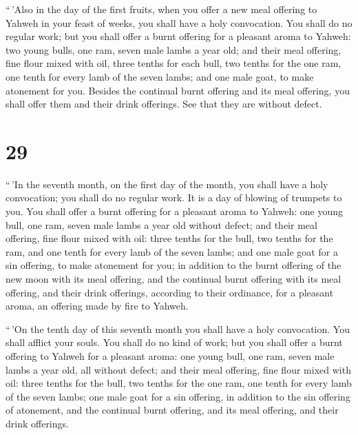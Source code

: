  ``\,'Also in the day of the first fruits, when you offer
a new meal offering to Yahweh in your feast of weeks, you shall have a
holy convocation. You shall do no regular work;  but you
shall offer a burnt offering for a pleasant aroma to Yahweh: two young
bulls, one ram, seven male lambs a year old;  and their
meal offering, fine flour mixed with oil, three tenths for each bull,
two tenths for the one ram,  one tenth for every lamb of
the seven lambs;  and one male goat, to make atonement
for you.  Besides the continual burnt offering and its
meal offering, you shall offer them and their drink offerings. See that
they are without defect.

\hypertarget{section-28}{%
\section{29}\label{section-28}}

 ``\,'In the seventh month, on the first day of the month,
you shall have a holy convocation; you shall do no regular work. It is a
day of blowing of trumpets to you.  You shall offer a
burnt offering for a pleasant aroma to Yahweh: one young bull, one ram,
seven male lambs a year old without defect;  and their
meal offering, fine flour mixed with oil: three tenths for the bull, two
tenths for the ram,  and one tenth for every lamb of the
seven lambs;  and one male goat for a sin offering, to
make atonement for you;  in addition to the burnt offering
of the new moon with its meal offering, and the continual burnt offering
with its meal offering, and their drink offerings, according to their
ordinance, for a pleasant aroma, an offering made by fire to Yahweh.

 ``\,'On the tenth day of this seventh month you shall
have a holy convocation. You shall afflict your souls. You shall do no
kind of work;  but you shall offer a burnt offering to
Yahweh for a pleasant aroma: one young bull, one ram, seven male lambs a
year old, all without defect;  and their meal offering,
fine flour mixed with oil: three tenths for the bull, two tenths for the
one ram,  one tenth for every lamb of the seven lambs;
 one male goat for a sin offering, in addition to the sin
offering of atonement, and the continual burnt offering, and its meal
offering, and their drink offerings.

